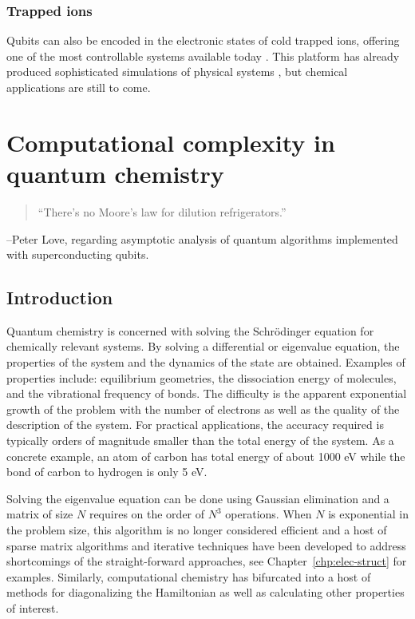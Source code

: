 \documentclass[11pt,oneside,final]{huthesis}%
\begin{document}
\subsection*{Trapped ions}

Qubits can also be encoded in the electronic states of cold trapped ions,
offering one of the most controllable systems available today
\cite{Cirac95,Johanning09,Blatt08}. This platform has
already produced sophisticated simulations of physical systems
\cite{Friedenauer08,Kim10,Gerritsma10}, but chemical
applications are still to come.


\chapter{Computational complexity in quantum chemistry}\label{chp:complexity}
\begin{quote}
	``There's no Moore's law for dilution refrigerators.''
\end{quote}
	--Peter Love, regarding asymptotic analysis of quantum algorithms implemented with superconducting qubits.

\section{Introduction}
Quantum chemistry is concerned with solving the Schr\"odinger equation for chemically relevant systems.  By solving a differential or eigenvalue equation, the properties of the system and the dynamics of the state are obtained.  Examples of properties include: equilibrium geometries, the dissociation energy of molecules, and the vibrational frequency of bonds.  The difficulty is the apparent exponential growth of the problem with the number of electrons as well as the quality of the description of the system. For practical applications, the accuracy required is typically orders of magnitude smaller than the total energy of the system. As a concrete example, an atom of carbon has total energy of about 1000 eV while the bond of carbon to hydrogen is only 5 eV. 

Solving the eigenvalue equation can be done using Gaussian elimination and a matrix of size $N$ requires on the order of $N^3$ operations.  When $N$ is exponential in the problem size, this algorithm is no longer considered efficient and a host of sparse matrix algorithms and iterative techniques have been developed to address shortcomings of the straight-forward approaches, see Chapter~\ref{chp:elec-struct} for examples.  Similarly, computational chemistry has bifurcated into a host of methods for diagonalizing the Hamiltonian as well as calculating other properties of interest.
\end{document}

